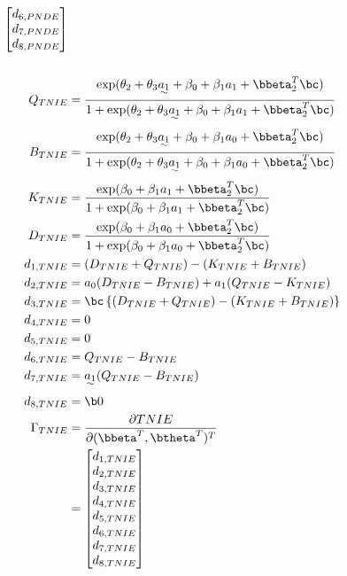 \documentclass[dvipdfmx,10pt]{article}
\begin{document}
\begin{align*}
\begin{bmatrix}
      d_{6,PNDE}\\
      d_{7,PNDE}\\
      d_{8,PNDE}\\
    \end{bmatrix}\\
  \\
  Q_{TNIE} &= \frac
      {    \exp(\theta_{2} + \theta_{3}\uwave{a_{1}} + \beta_{0} + \beta_{1}a_{1} + \bbeta_{2}^{T}\bc)}
      {1 + \exp(\theta_{2} + \theta_{3}\uwave{a_{1}} + \beta_{0} + \beta_{1}a_{1} + \bbeta_{2}^{T}\bc)}\\
  B_{TNIE} &= \frac
      {    \exp(\theta_{2} + \theta_{3}\uwave{a_{1}} + \beta_{0} + \beta_{1}a_{0} + \bbeta_{2}^{T}\bc)}
      {1 + \exp(\theta_{2} + \theta_{3}\uwave{a_{1}} + \beta_{0} + \beta_{1}a_{0} + \bbeta_{2}^{T}\bc)}\\
  K_{TNIE} &= \frac
      {    \exp(\beta_{0} + \beta_{1}a_{1} + \bbeta_{2}^{T}\bc)}
      {1 + \exp(\beta_{0} + \beta_{1}a_{1} + \bbeta_{2}^{T}\bc)}\\
  D_{TNIE} &= \frac
      {    \exp(\beta_{0} + \beta_{1}a_{0} + \bbeta_{2}^{T}\bc)}
      {1 + \exp(\beta_{0} + \beta_{1}a_{0} + \bbeta_{2}^{T}\bc)}\\
  d_{1,TNIE} &= (D_{TNIE} + Q_{TNIE}) - (K_{TNIE} + B_{TNIE})\\
  d_{2,TNIE} &= a_{0}(D_{TNIE} - B_{TNIE}) + a_{1}(Q_{TNIE} - K_{TNIE})\\
  d_{3,TNIE} &= \bc \left\{ (D_{TNIE} + Q_{TNIE}) - (K_{TNIE} + B_{TNIE}) \right\}\\
  d_{4,TNIE} &= 0\\
  d_{5,TNIE} &= 0\\
  d_{6,TNIE} &= Q_{TNIE} - B_{TNIE}\\
  d_{7,TNIE} &= \uwave{a_{1}} (Q_{TNIE} - B_{TNIE})\\
  d_{8,TNIE} &= \b0\\
  \Gamma_{TNIE}
  &= \frac{\partial TNIE}{\partial (\bbeta^{T},\btheta^{T})^{T}}\\
  &= \begin{bmatrix}
      d_{1,TNIE}\\
      d_{2,TNIE}\\
      d_{3,TNIE}\\
      d_{4,TNIE}\\
      d_{5,TNIE}\\
      d_{6,TNIE}\\
      d_{7,TNIE}\\
      d_{8,TNIE}\\
    \end{bmatrix}\\

\end{align*}
\end{document}
